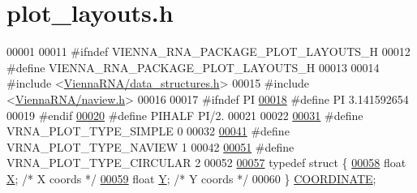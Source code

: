 \hypertarget{plot__layouts_8h_source}{}\section{plot\+\_\+layouts.\+h}
\label{plot__layouts_8h_source}

\begin{DoxyCode}
00001 
00011 \textcolor{preprocessor}{#ifndef VIENNA\_RNA\_PACKAGE\_PLOT\_LAYOUTS\_H}
00012 \textcolor{preprocessor}{#define VIENNA\_RNA\_PACKAGE\_PLOT\_LAYOUTS\_H}
00013 
00014 \textcolor{preprocessor}{#include <\mbox{\hyperlink{data__structures_8h}{ViennaRNA/data\_structures.h}}>}
00015 \textcolor{preprocessor}{#include <\mbox{\hyperlink{naview_8h}{ViennaRNA/naview.h}}>}
00016 
00017 \textcolor{preprocessor}{#ifndef PI}
\mbox{\hyperlink{group__plotting__utils_ga598a3330b3c21701223ee0ca14316eca}{00018}} \textcolor{preprocessor}{#define  PI       3.141592654}
00019 \textcolor{preprocessor}{#endif}
\mbox{\hyperlink{group__plotting__utils_ga4ffe7c60ebdd6907b33ed6e1808ac465}{00020}} \textcolor{preprocessor}{#define  PIHALF       PI/2.}
00021 
00022 
\mbox{\hyperlink{group__plotting__utils_gae6d17b9f0a53cf5205a9181e0f8422e9}{00031}} \textcolor{preprocessor}{#define VRNA\_PLOT\_TYPE\_SIMPLE     0}
00032 
\mbox{\hyperlink{group__plotting__utils_ga94d4c863ecac2f220f76658afb92f964}{00041}} \textcolor{preprocessor}{#define VRNA\_PLOT\_TYPE\_NAVIEW     1}
00042 
\mbox{\hyperlink{group__plotting__utils_ga8c9eac631348da92136c8363ecdd9fb9}{00051}} \textcolor{preprocessor}{#define VRNA\_PLOT\_TYPE\_CIRCULAR   2}
00052 
\mbox{\hyperlink{group__plotting__utils}{00057}} \textcolor{keyword}{typedef} \textcolor{keyword}{struct }\{
\mbox{\hyperlink{group__plotting__utils_a1650ff457f1fcf1b29dfccf1cbe4c3e9}{00058}}   \textcolor{keywordtype}{float} \mbox{\hyperlink{group__plotting__utils_a1650ff457f1fcf1b29dfccf1cbe4c3e9}{X}}; \textcolor{comment}{/* X coords */}
\mbox{\hyperlink{group__plotting__utils_a827df1c548f95486abf6c6a94d6ce6b2}{00059}}   \textcolor{keywordtype}{float} \mbox{\hyperlink{group__plotting__utils_a827df1c548f95486abf6c6a94d6ce6b2}{Y}}; \textcolor{comment}{/* Y coords */}
00060 \} \mbox{\hyperlink{group__plotting__utils_struct_c_o_o_r_d_i_n_a_t_e}{COORDINATE}};

\end{DoxyCode}
